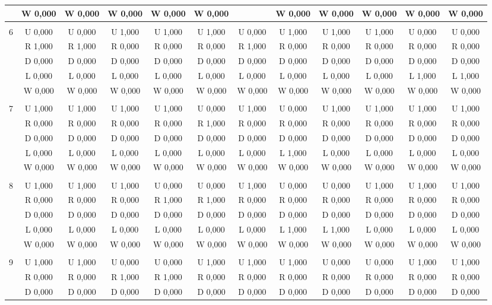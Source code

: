 \begin{table}[htbp]
\begin{footnotesize}
\begin{tabular}{c|c|c|c|c|c|c|c|c|c|c|c|}
&W 0,000&W 0,000&W 0,000&W 0,000&W 0,000&&W 0,000&W 0,000&W 0,000&W 0,000&W 0,000\\
\hline \\
6&U 0,000&U 0,000&U 1,000&U 1,000&U 1,000&U 0,000&U 1,000&U 1,000&U 1,000&U 0,000&U 0,000\\
&R 1,000&R 1,000&R 0,000&R 0,000&R 0,000&R 1,000&R 0,000&R 0,000&R 0,000&R 0,000&R 0,000\\
&D 0,000&D 0,000&D 0,000&D 0,000&D 0,000&D 0,000&D 0,000&D 0,000&D 0,000&D 0,000&D 0,000\\
&L 0,000&L 0,000&L 0,000&L 0,000&L 0,000&L 0,000&L 0,000&L 0,000&L 0,000&L 1,000&L 1,000\\
&W 0,000&W 0,000&W 0,000&W 0,000&W 0,000&W 0,000&W 0,000&W 0,000&W 0,000&W 0,000&W 0,000\\
\hline \\
7&U 1,000&U 1,000&U 1,000&U 1,000&U 0,000&U 1,000&U 0,000&U 1,000&U 1,000&U 1,000&U 1,000\\
&R 0,000&R 0,000&R 0,000&R 0,000&R 1,000&R 0,000&R 0,000&R 0,000&R 0,000&R 0,000&R 0,000\\
&D 0,000&D 0,000&D 0,000&D 0,000&D 0,000&D 0,000&D 0,000&D 0,000&D 0,000&D 0,000&D 0,000\\
&L 0,000&L 0,000&L 0,000&L 0,000&L 0,000&L 0,000&L 1,000&L 0,000&L 0,000&L 0,000&L 0,000\\
&W 0,000&W 0,000&W 0,000&W 0,000&W 0,000&W 0,000&W 0,000&W 0,000&W 0,000&W 0,000&W 0,000\\
\hline \\
8&U 1,000&U 1,000&U 1,000&U 0,000&U 0,000&U 1,000&U 0,000&U 0,000&U 1,000&U 1,000&U 1,000\\
&R 0,000&R 0,000&R 0,000&R 1,000&R 1,000&R 0,000&R 0,000&R 0,000&R 0,000&R 0,000&R 0,000\\
&D 0,000&D 0,000&D 0,000&D 0,000&D 0,000&D 0,000&D 0,000&D 0,000&D 0,000&D 0,000&D 0,000\\
&L 0,000&L 0,000&L 0,000&L 0,000&L 0,000&L 0,000&L 1,000&L 1,000&L 0,000&L 0,000&L 0,000\\
&W 0,000&W 0,000&W 0,000&W 0,000&W 0,000&W 0,000&W 0,000&W 0,000&W 0,000&W 0,000&W 0,000\\
\hline \\
9&U 1,000&U 1,000&U 0,000&U 0,000&U 1,000&U 1,000&U 1,000&U 0,000&U 0,000&U 1,000&U 1,000\\
&R 0,000&R 0,000&R 1,000&R 1,000&R 0,000&R 0,000&R 0,000&R 0,000&R 0,000&R 0,000&R 0,000\\
&D 0,000&D 0,000&D 0,000&D 0,000&D 0,000&D 0,000&D 0,000&D 0,000&D 0,000&D 0,000&D 0,000\\

\end{tabular}
\end{footnotesize}
\end{table}
